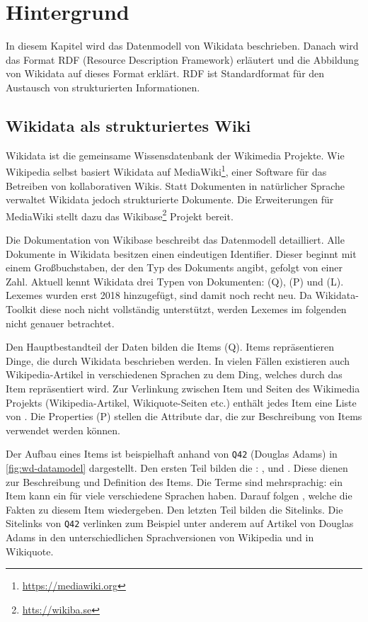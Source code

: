 %
\chapter{Hintergrund}
\label{sec:concepts}
In diesem Kapitel wird das Datenmodell von Wikidata beschrieben.
Danach wird das Format RDF (Resource Description Framework) erläutert und die Abbildung von Wikidata auf dieses Format erklärt.
RDF ist Standardformat für den Austausch von strukturierten Informationen. 

\section{Wikidata als strukturiertes Wiki}
Wikidata ist die gemeinsame Wissensdatenbank der Wikimedia Projekte.
Wie Wikipedia selbst basiert Wikidata auf MediaWiki\footnote{\url{https://mediawiki.org}}, einer Software für das Betreiben von kollaborativen Wikis.
Statt Dokumenten in natürlicher Sprache verwaltet Wikidata jedoch strukturierte Dokumente.
Die Erweiterungen für MediaWiki stellt dazu das Wikibase\footnote{\url{htts://wikiba.se}} Projekt bereit.

Die Dokumentation von Wikibase \cite{wikibase-data-model} beschreibt das Datenmodell detailliert.
Alle Dokumente in Wikidata besitzen einen eindeutigen Identifier.
Dieser beginnt mit einem Großbuchstaben, der den Typ des Dokuments angibt, gefolgt von einer Zahl.
Aktuell kennt Wikidata drei Typen von Dokumenten:  (Q),  (P) und  (L).
Lexemes wurden erst 2018 hinzugefügt, sind damit noch recht neu.
Da Wikidata-Toolkit diese noch nicht vollständig unterstützt, werden Lexemes im folgenden nicht genauer betrachtet.

Den Hauptbestandteil der Daten bilden die Items (Q).
Items repräsentieren Dinge, die durch Wikidata beschrieben werden.
In vielen Fällen existieren auch Wikipedia-Artikel in verschiedenen Sprachen zu dem Ding, welches durch das Item repräsentiert wird.
Zur Verlinkung zwischen Item und Seiten des Wikimedia Projekts (Wikipedia-Artikel, Wikiquote-Seiten etc.) enthält jedes Item eine Liste von .
Die Properties (P) stellen die Attribute dar, die zur Beschreibung von Items verwendet werden können.

Der Aufbau eines Items ist beispielhaft anhand von \verb|Q42| (Douglas Adams) in \cref{fig:wd-datamodel} dargestellt.
Den ersten Teil bilden die : ,  und .
Diese dienen zur Beschreibung und Definition des Items.
Die Terme sind mehrsprachig: ein Item kann ein  für viele verschiedene Sprachen haben.
Darauf folgen , welche die Fakten zu diesem Item wiedergeben.
Den letzten Teil bilden die Sitelinks.
Die Sitelinks von \verb|Q42| verlinken zum Beispiel unter anderem auf Artikel von Douglas Adams in den unterschiedlichen Sprachversionen von Wikipedia und in Wikiquote.

